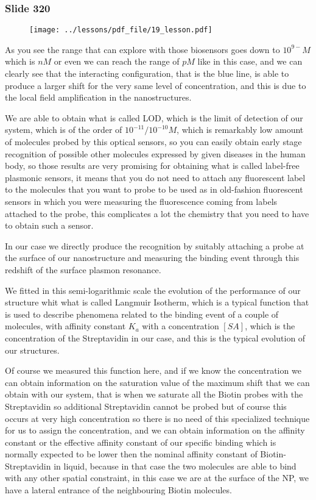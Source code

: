 \documentclass[../main/main.tex]{subfiles}
\begin{document}
\subsubsection{Slide 320}

\begin{figure}[h!]
\centering
\texttt{[image: ../lessons/pdf\_file/19\_lesson.pdf]}
\end{figure}

As you see the range that can explore with those biosensors goes down to $10^{9-} M$ which is $nM$ or even we can reach the range of $pM$ like in this case, and we can clearly see that the interacting configuration, that is the blue line, is able to produce a larger shift for the very same level of concentration, and this is due to the local field amplification in the nanostructures. 

We are able to obtain what is called LOD, which is the limit of detection of our system, which is of the order of $10^{-11}/10^{-10} M$, which is remarkably low amount of molecules probed by this optical sensors, so you can easily obtain early stage recognition of possible other molecules expressed by given diseases in the human body, so those results are very promising for obtaining what is called label-free plasmonic sensors, it means that you do not need to attach any fluorescent label to the molecules that you want to probe to be used as in old-fashion fluorescent sensors in which you were measuring the fluorescence coming from labels attached to the probe, this complicates a lot the chemistry that you need to have to obtain such a sensor.

In our case we directly produce the recognition by suitably attaching a probe at the surface of our nanostructure and measuring the binding event through this redshift of the surface plasmon resonance.

We fitted in this semi-logarithmic scale the evolution of the performance of our structure whit what is called Langmuir Isotherm, which is a typical function that is used to describe phenomena related to the binding event of a couple of molecules, with affinity constant $K_a$ with a concentration $[SA]$, which is the concentration of the Streptavidin in our case, and this is the typical evolution of our structures.

Of course we measured this function here, and if we know the concentration we can obtain information on the saturation value of the maximum shift that we can obtain with our system, that is when we saturate all the Biotin probes with the Streptavidin so additional Streptavidin cannot be probed but of course this occurs at very high concentration so there is no need of this specialized technique for us to assign the concentration, and we can obtain information on the affinity constant or the effective affinity constant of our specific binding which is normally expected to be lower then the nominal affinity constant of Biotin-Streptavidin in liquid, because in that case the two molecules are able to bind with any other spatial constraint, in this case we are at the surface of the NP, we have a lateral entrance of the neighbouring Biotin molecules.
\end{document}
